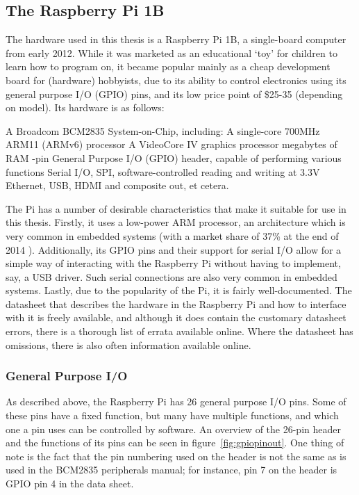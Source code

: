 \documentclass[twoside]{uva-inf-bachelor-thesis}
\begin{document}
\subsection{The Raspberry Pi 1B}
The hardware used in this thesis is a Raspberry Pi 1B, a single-board computer from early 2012. While it was marketed as an educational `toy' for children to learn how to program on, it became popular mainly as a cheap development board for (hardware) hobbyists, due to its ability to control electronics using its general purpose I/O (GPIO) pins, and its low price point of \$25-35 (depending on model). Its hardware is as follows:

\begin{outline}
    \1 A Broadcom BCM2835 System-on-Chip, including:
        \2 A single-core 700MHz ARM11 (ARMv6) processor
        \2 A VideoCore IV graphics processor
         megabytes of RAM
    -pin General Purpose I/O (GPIO) header, capable of performing various functions
        \2 Serial I/O, SPI, software-controlled reading and writing at 3.3V
    \1 Ethernet, USB, HDMI and composite out, et cetera.
\end{outline}

The Pi has a number of desirable characteristics that make it suitable for use in this thesis. Firstly, it uses a low-power ARM processor, an architecture which is very common in embedded systems (with a market share of 37\% at the end of 2014 \cite{arm:embeddedmarketshare}). Additionally, its GPIO pins and their support for serial I/O allow for a simple way of interacting with the Raspberry Pi without having to implement, say, a USB driver. Such serial connections are also very common in embedded systems. Lastly, due to the popularity of the Pi, it is fairly well-documented. The datasheet that describes the hardware in the Raspberry Pi and how to interface with it is freely available\cite{bcm:2835peripherals}, and although it does contain the customary datasheet errors, there is a thorough list of errata available online\cite{bcm:2835errata}. Where the datasheet has omissions, there is also often information available online.


\subsubsection{General Purpose I/O}
As described above, the Raspberry Pi has 26 general purpose I/O pins. Some of these pins have a fixed function, but many have multiple functions, and which one a pin uses can be controlled by software. An overview of the 26-pin header and the functions of its pins can be seen in figure~\ref{fig:gpiopinout}. One thing of note is the fact that the pin numbering used on the header is not the same as is used in the BCM2835 peripherals manual; for instance, pin 7 on the header is GPIO pin 4 in the data sheet.
\end{document}

